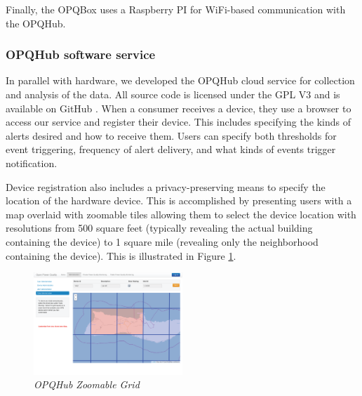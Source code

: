 Finally, the OPQBox uses a Raspberry PI for WiFi-based communication with the OPQHub. 

\subsubsection{OPQHub software service}

In parallel with hardware, we developed the OPQHub cloud service for collection and analysis of the data. All source code is licensed under the GPL V3 and is available on GitHub \cite{opq-github}.  When a consumer receives a device, they use a browser to access our service and register their device. This includes specifying the kinds of alerts desired and how to receive them.  Users can specify both thresholds for event triggering, frequency of alert delivery, and what kinds of events trigger notification. 

Device registration also includes a privacy-preserving means to specify the location of the hardware device. This is accomplished by presenting users with a map overlaid with zoomable tiles allowing them to select the device location with resolutions from 500 square feet (typically revealing the actual building containing the device) to 1 square mile (revealing only the neighborhood containing the device). This is illustrated in Figure \ref{fig:cloud-grid}.

\begin{figure}
  \includegraphics[width=0.5\textwidth]{figures/cloud-grid.eps}
  \caption{\em \small OPQHub Zoomable Grid}
  \label{fig:cloud-grid}
\end{figure}  



